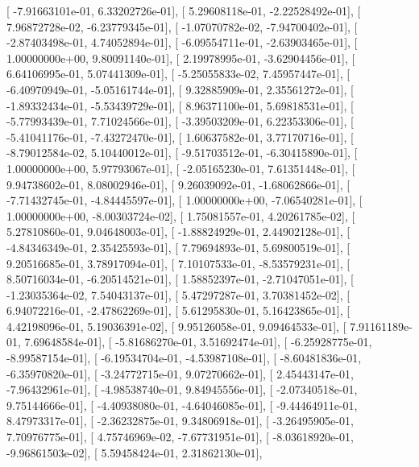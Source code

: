 \documentclass{article}
\begin{document}
       [ -7.91663101e-01,   6.33202726e-01],
       [  5.29608118e-01,  -2.22528492e-01],
       [  7.96872728e-02,  -6.23779345e-01],
       [ -1.07070782e-02,  -7.94700402e-01],
       [ -2.87403498e-01,   4.74052894e-01],
       [ -6.09554711e-01,  -2.63903465e-01],
       [  1.00000000e+00,   9.80091140e-01],
       [  2.19978995e-01,  -3.62904456e-01],
       [  6.64106995e-01,   5.07441309e-01],
       [ -5.25055833e-02,   7.45957447e-01],
       [ -6.40970949e-01,  -5.05161744e-01],
       [  9.32885909e-01,   2.35561272e-01],
       [ -1.89332434e-01,  -5.53439729e-01],
       [  8.96371100e-01,   5.69818531e-01],
       [ -5.77993439e-01,   7.71024566e-01],
       [ -3.39503209e-01,   6.22353306e-01],
       [ -5.41041176e-01,  -7.43272470e-01],
       [  1.60637582e-01,   3.77170716e-01],
       [ -8.79012584e-02,   5.10440012e-01],
       [ -9.51703512e-01,  -6.30415890e-01],
       [  1.00000000e+00,   5.97793067e-01],
       [ -2.05165230e-01,   7.61351448e-01],
       [  9.94738602e-01,   8.08002946e-01],
       [  9.26039092e-01,  -1.68062866e-01],
       [ -7.71432745e-01,  -4.84445597e-01],
       [  1.00000000e+00,  -7.06540281e-01],
       [  1.00000000e+00,  -8.00303724e-02],
       [  1.75081557e-01,   4.20261785e-02],
       [  5.27810860e-01,   9.04648003e-01],
       [ -1.88824929e-01,   2.44902128e-01],
       [ -4.84346349e-01,   2.35425593e-01],
       [  7.79694893e-01,   5.69800519e-01],
       [  9.20516685e-01,   3.78917094e-01],
       [  7.10107533e-01,  -8.53579231e-01],
       [  8.50716034e-01,  -6.20514521e-01],
       [  1.58852397e-01,  -2.71047051e-01],
       [ -1.23035364e-02,   7.54043137e-01],
       [  5.47297287e-01,   3.70381452e-02],
       [  6.94072216e-01,  -2.47862269e-01],
       [  5.61295830e-01,   5.16423865e-01],
       [  4.42198096e-01,   5.19036391e-02],
       [  9.95126058e-01,   9.09464533e-01],
       [  7.91161189e-01,   7.69648584e-01],
       [ -5.81686270e-01,   3.51692474e-01],
       [ -6.25928775e-01,  -8.99587154e-01],
       [ -6.19534704e-01,  -4.53987108e-01],
       [ -8.60481836e-01,  -6.35970820e-01],
       [ -3.24772715e-01,   9.07270662e-01],
       [  2.45443147e-01,  -7.96432961e-01],
       [ -4.98538740e-01,   9.84945556e-01],
       [ -2.07340518e-01,   9.75144666e-01],
       [ -4.40938080e-01,  -4.64046085e-01],
       [ -9.44464911e-01,   8.47973317e-01],
       [ -2.36232875e-01,   9.34806918e-01],
       [ -3.26495905e-01,   7.70976775e-01],
       [  4.75746969e-02,  -7.67731951e-01],
       [ -8.03618920e-01,  -9.96861503e-02],
       [  5.59458424e-01,   2.31862130e-01],
\end{document}
